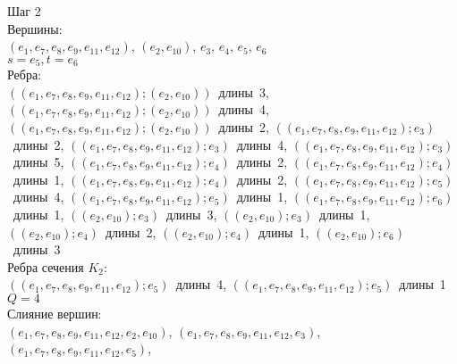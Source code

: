 \documentclass[a4paper,12pt]{article}
\begin{document}
\bigskip
\noindent
\begin{minipage}{\textwidth}
Шаг 2\\
Вершины:\\
\mbox{$(e_{1},e_{7},e_{8},e_{9},e_{11},e_{12})$},
\mbox{$(e_{2},e_{10})$},
\mbox{$e_{3}$},
\mbox{$e_{4}$},
\mbox{$e_{5}$},
\mbox{$e_{6}$}\\
\mbox{$s=e_{5},t=e_{6}$}\\
Ребра:\\
\mbox{$((e_{1},e_{7},e_{8},e_{9},e_{11},e_{12});(e_{2},e_{10}))$ длины 3},
\mbox{$((e_{1},e_{7},e_{8},e_{9},e_{11},e_{12});(e_{2},e_{10}))$ длины 4},
\mbox{$((e_{1},e_{7},e_{8},e_{9},e_{11},e_{12});(e_{2},e_{10}))$ длины 2},
\mbox{$((e_{1},e_{7},e_{8},e_{9},e_{11},e_{12});e_{3})$ длины 2},
\mbox{$((e_{1},e_{7},e_{8},e_{9},e_{11},e_{12});e_{3})$ длины 4},
\mbox{$((e_{1},e_{7},e_{8},e_{9},e_{11},e_{12});e_{3})$ длины 5},
\mbox{$((e_{1},e_{7},e_{8},e_{9},e_{11},e_{12});e_{4})$ длины 2},
\mbox{$((e_{1},e_{7},e_{8},e_{9},e_{11},e_{12});e_{4})$ длины 1},
\mbox{$((e_{1},e_{7},e_{8},e_{9},e_{11},e_{12});e_{4})$ длины 2},
\mbox{$((e_{1},e_{7},e_{8},e_{9},e_{11},e_{12});e_{5})$ длины 4},
\mbox{$((e_{1},e_{7},e_{8},e_{9},e_{11},e_{12});e_{5})$ длины 1},
\mbox{$((e_{1},e_{7},e_{8},e_{9},e_{11},e_{12});e_{6})$ длины 1},
\mbox{$((e_{2},e_{10});e_{3})$ длины 3},
\mbox{$((e_{2},e_{10});e_{3})$ длины 1},
\mbox{$((e_{2},e_{10});e_{4})$ длины 2},
\mbox{$((e_{2},e_{10});e_{4})$ длины 1},
\mbox{$((e_{2},e_{10});e_{6})$ длины 3}\\
Ребра сечения $K_{2}$:\\
\mbox{$((e_{1},e_{7},e_{8},e_{9},e_{11},e_{12});e_{5})$ длины 4},
\mbox{$((e_{1},e_{7},e_{8},e_{9},e_{11},e_{12});e_{5})$ длины 1}\\
$Q=4$\\
Слияние вершин:\\
\mbox{$(e_{1},e_{7},e_{8},e_{9},e_{11},e_{12},e_{2},e_{10})$},
\mbox{$(e_{1},e_{7},e_{8},e_{9},e_{11},e_{12},e_{3})$},
\mbox{$(e_{1},e_{7},e_{8},e_{9},e_{11},e_{12},e_{5})$},
\end{minipage}
\end{document}
